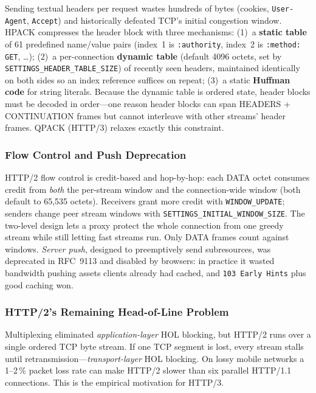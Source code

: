 Sending textual headers per request wastes hundreds of bytes (cookies, \texttt{User-Agent}, \texttt{Accept}) and historically defeated TCP's initial congestion window. HPACK \cite{rfc7541} compresses the header block with three mechanisms: (1)~a \textbf{static table} of 61 predefined name/value pairs (index~1 is \texttt{:authority}, index~2 is \texttt{:method: GET}, \dots); (2)~a per-connection \textbf{dynamic table} (default 4096 octets, set by \texttt{SETTINGS\_HEADER\_TABLE\_SIZE}) of recently seen headers, maintained identically on both sides so an index reference suffices on repeat; (3)~a static \textbf{Huffman code} for string literals. Because the dynamic table is ordered state, header blocks must be decoded in order---one reason header blocks can span HEADERS + CONTINUATION frames but cannot interleave with other streams' header frames. QPACK (HTTP/3) relaxes exactly this constraint.

\subsubsection{Flow Control and Push Deprecation}

HTTP/2 flow control is credit-based and hop-by-hop: each DATA octet consumes credit from \emph{both} the per-stream window and the connection-wide window (both default to 65{,}535 octets). Receivers grant more credit with \texttt{WINDOW\_UPDATE}; senders change peer stream windows with \texttt{SETTINGS\_INITIAL\_WINDOW\_SIZE}. The two-level design lets a proxy protect the whole connection from one greedy stream while still letting fast streams run. Only DATA frames count against windows. \emph{Server push}, designed to preemptively send subresources, was deprecated in RFC~9113 and disabled by browsers: in practice it wasted bandwidth pushing assets clients already had cached, and \texttt{103 Early Hints} plus good caching won.

\subsubsection{HTTP/2's Remaining Head-of-Line Problem}

Multiplexing eliminated \emph{application-layer} HOL blocking, but HTTP/2 runs over a single ordered TCP byte stream. If one TCP segment is lost, every stream stalls until retransmission---\emph{transport-layer} HOL blocking. On lossy mobile networks a 1--2\,\% packet loss rate can make HTTP/2 slower than six parallel HTTP/1.1 connections. This is the empirical motivation for HTTP/3.

